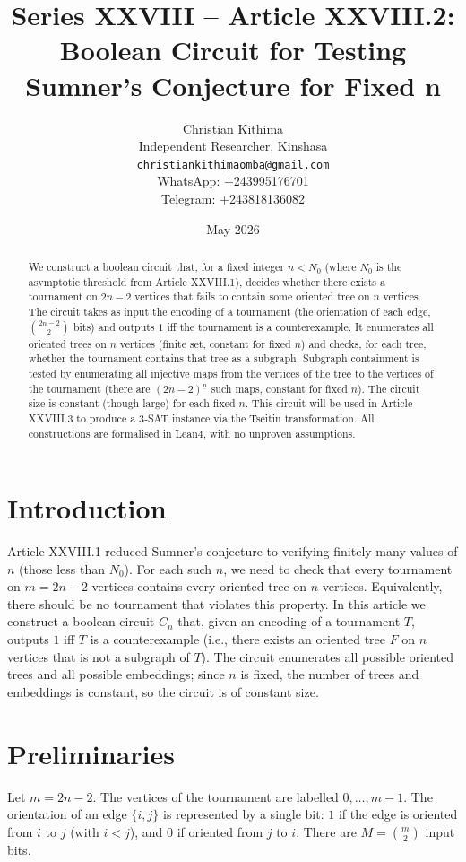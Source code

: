 \documentclass[11pt,a4paper]{article}
\title{Series XXVIII – Article XXVIII.2: Boolean Circuit for Testing Sumner's Conjecture for Fixed n}
\author{Christian Kithima \\
Independent Researcher, Kinshasa \\
\texttt{christiankithimaomba@gmail.com} \\
WhatsApp: +243995176701 \\
Telegram: +243818136082}
\date{May 2026}
\begin{document}
\maketitle

\begin{abstract}
We construct a boolean circuit that, for a fixed integer $n < N_0$ (where $N_0$ is the asymptotic threshold from Article XXVIII.1), decides whether there exists a tournament on $2n-2$ vertices that fails to contain some oriented tree on $n$ vertices. The circuit takes as input the encoding of a tournament (the orientation of each edge, $\binom{2n-2}{2}$ bits) and outputs $1$ iff the tournament is a counterexample. It enumerates all oriented trees on $n$ vertices (finite set, constant for fixed $n$) and checks, for each tree, whether the tournament contains that tree as a subgraph. Subgraph containment is tested by enumerating all injective maps from the vertices of the tree to the vertices of the tournament (there are $(2n-2)^{\underline{n}}$ such maps, constant for fixed $n$). The circuit size is constant (though large) for each fixed $n$. This circuit will be used in Article XXVIII.3 to produce a 3‑SAT instance via the Tseitin transformation. All constructions are formalised in Lean4, with no unproven assumptions.
\end{abstract}

\tableofcontents

\section{Introduction}
Article XXVIII.1 reduced Sumner's conjecture to verifying finitely many values of $n$ (those less than $N_0$). For each such $n$, we need to check that every tournament on $m = 2n-2$ vertices contains every oriented tree on $n$ vertices. Equivalently, there should be no tournament that violates this property. In this article we construct a boolean circuit $C_n$ that, given an encoding of a tournament $T$, outputs $1$ iff $T$ is a counterexample (i.e., there exists an oriented tree $F$ on $n$ vertices that is not a subgraph of $T$). The circuit enumerates all possible oriented trees and all possible embeddings; since $n$ is fixed, the number of trees and embeddings is constant, so the circuit is of constant size.

\section{Preliminaries}
Let $m = 2n-2$. The vertices of the tournament are labelled $0,\dots,m-1$. The orientation of an edge $\{i,j\}$ is represented by a single bit: $1$ if the edge is oriented from $i$ to $j$ (with $i<j$), and $0$ if oriented from $j$ to $i$. There are $M = \binom{m}{2}$ input bits.
\end{document}
